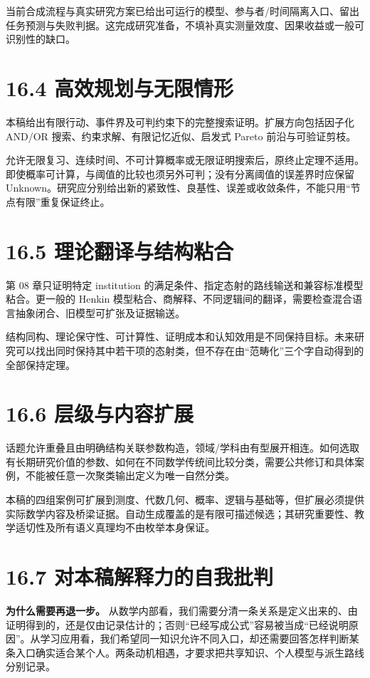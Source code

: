 \documentclass[UTF8,a4paper,zihao=-4,fontset=windows,openany]{ctexbook}
\begin{document}
当前合成流程与真实研究方案已给出可运行的模型、参与者/时间隔离入口、留出任务预测与失败判据。这完成研究准备，不填补真实测量效度、因果收益或一般可识别性的缺口。

\section{16.4 高效规划与无限情形}
本稿给出有限行动、事件界及可判约束下的完整搜索证明。扩展方向包括因子化 AND/OR 搜索、约束求解、有限记忆近似、启发式 Pareto 前沿与可验证剪枝。

允许无限复习、连续时间、不可计算概率或无限证明搜索后，原终止定理不适用。即使概率可计算，与阈值的比较也须另外可判；没有分离阈值的误差界时应保留 Unknown。研究应分别给出新的紧致性、良基性、误差或收敛条件，不能只用“节点有限”重复保证终止。

\section{16.5 理论翻译与结构粘合}
第 08 章只证明特定 institution 的满足条件、指定态射的路线输送和兼容标准模型粘合。更一般的 Henkin 模型粘合、商解释、不同逻辑间的翻译，需要检查混合语言抽象闭合、旧模型可扩张及证据输送。

结构同构、理论保守性、可计算性、证明成本和认知效用是不同保持目标。未来研究可以找出同时保持其中若干项的态射类，但不存在由“范畴化”三个字自动得到的全部保持定理。

\section{16.6 层级与内容扩展}
话题允许重叠且由明确结构关联参数构造，领域/学科由有型展开相连。如何选取有长期研究价值的参数、如何在不同数学传统间比较分类，需要公共修订和具体案例，不能被任意一次聚类输出定义为唯一自然分类。

本稿的四组案例可扩展到测度、代数几何、概率、逻辑与基础等，但扩展必须提供实际数学内容及桥梁证据。自动生成覆盖的是有限可描述候选；其研究重要性、教学适切性及所有语义真理均不由枚举本身保证。

\section{16.7 对本稿解释力的自我批判}
\textbf{为什么需要再退一步。} 从数学内部看，我们需要分清一条关系是定义出来的、由证明得到的，还是仅由记录估计的；否则“已经写成公式”容易被当成“已经说明原因”。从学习应用看，我们希望同一知识允许不同入口，却还需要回答怎样判断某条入口确实适合某个人。两条动机相遇，才要求把共享知识、个人模型与派生路线分别记录。
\end{document}
